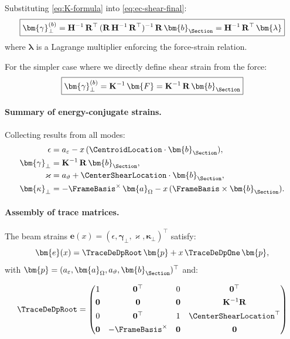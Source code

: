 Substituting \eqref{eq:K-formula} into \eqref{eq:ec-shear-final}:
\begin{equation}
\boxed{\bm{\gamma}_\perp^{(b)} = \mathbf{H}^{-1}\,\mathbf{R}^\top\,(\mathbf{R}\,\mathbf{H}^{-1}\,\mathbf{R}^\top)^{-1}\,\mathbf{R}\,\bm{b}_{\Section} 
= \mathbf{H}^{-1}\,\mathbf{R}^\top\,\bm{\lambda}}
\label{eq:ec-shear-explicit}
\end{equation}
where $\bm{\lambda}$ is a Lagrange multiplier enforcing the force-strain relation.

For the simpler case where we directly define shear strain from the force:
\begin{equation}
\boxed{\bm{\gamma}_\perp^{(b)} = \mathbf{K}^{-1}\,\bm{F} = \mathbf{K}^{-1}\,\mathbf{R}\,\bm{b}_{\Section}}
\end{equation}

\paragraph{Summary of energy-conjugate strains.}

Collecting results from all modes:
\begin{align}
\epsilon &= a_\varepsilon - x\,(\CentroidLocation \cdot \bm{b}_{\Section}), 
\label{eq:ec-axial-final} \\
\bm{\gamma}_\perp &= \mathbf{K}^{-1}\,\mathbf{R}\,\bm{b}_{\Section}, 
\label{eq:ec-shear-final2} \\
\varkappa &= a_\vartheta + \CenterShearLocation \cdot \bm{b}_{\Section}, 
\label{eq:ec-twist-final} \\
\bm{\kappa}_\perp &= -\FrameBasis^\times\,\bm{a}_\Omega - x\,(\FrameBasis \times \bm{b}_{\Section}).
\label{eq:ec-curv-final}
\end{align}

\paragraph{Assembly of trace matrices.}

The beam strains $\bm{e}(x) = (\epsilon, \bm{\gamma}_\perp, \varkappa, \bm{\kappa}_\perp)^\top$ 
satisfy:
\begin{equation}
\bm{e}(x) = \TraceDeDpRoot\,\bm{p} + x\,\TraceDeDpOne\,\bm{p},
\end{equation}
with $\bm{p} = (a_\varepsilon, \bm{a}_\Omega, a_\vartheta, \bm{b}_{\Section})^\top$ and:

\begin{equation}
\TraceDeDpRoot = \begin{pmatrix}
1 & \mathbf{0}^\top & 0 & \mathbf{0}^\top \\[4pt]
\mathbf{0} & \mathbf{0} & \mathbf{0} & \mathbf{K}^{-1}\mathbf{R} \\[4pt]
0 & \mathbf{0}^\top & 1 & \CenterShearLocation^\top \\[4pt]
\mathbf{0} & -\FrameBasis^\times & \mathbf{0} & \mathbf{0}
\end{pmatrix}
\label{eq:T0-romano-final}
\end{equation}

